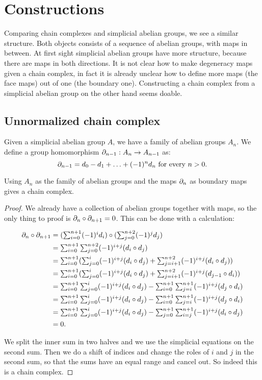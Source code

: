 \section{Constructions}
\label{sec:Constructions}

Comparing chain complexes and simplicial abelian groups, we see a similar structure. Both objects consists of a sequence of abelian groups, with maps in between. At first sight simplicial abelian groups have more structure, because there are maps in both directions. It is not clear how to make degeneracy maps given a chain complex, in fact it is already unclear how to define more maps (the face maps) out of one (the boundary one). Constructing a chain complex from a simplicial abelian group on the other hand seems doable.

\subsection{Unnormalized chain complex}
Given a simplicial abelian group $A$, we have a family of abelian groups $A_n$. We define a group homomorphism $\partial_{n-1} : A_n \to A_{n-1}$ as:
$$\partial_{n-1} = d_0 - d_1 + \ldots + (-1)^n d_n \text{ for every } n > 0.$$
\begin{lemma}
	Using $A_n$ as the family of abelian groups and the maps $\partial_n$ as boundary maps gives a chain complex.
\end{lemma}
\begin{proof}
	We already have a collection of abelian groups together with maps, so the only thing to proof is $\partial_n \circ \partial_{n+1} = 0$. This can be done with a calculation:

	\begin{align*}
		\partial_n \circ \partial_{n+1} &= \textstyle (\sum_{i=0}^{n+1} (-1)^i d_i) \circ (\sum_{j=0}^{n+2} (-1)^j d_j) \\
			&= \textstyle \sum_{i=0}^{n+1}  \sum_{j=0}^{n+2} (-1)^{i+j} (d_i \circ d_j) \\
			&= \textstyle \sum_{i=0}^{n+1} (\sum_{j=0}^{i} (-1)^{i+j} (d_i \circ d_j) + \sum_{j=i+1}^{n+2} (-1)^{i+j} (d_i \circ d_j)) \\
			&= \textstyle \sum_{i=0}^{n+1} (\sum_{j=0}^{i} (-1)^{i+j} (d_i \circ d_j) + \sum_{j=i+1}^{n+2} (-1)^{i+j} (d_{j-1} \circ d_i)) \\
			&= \textstyle \sum_{i=0}^{n+1}  \sum_{j=0}^{i} (-1)^{i+j} (d_i \circ d_j) - \sum_{i=0}^{n+1} \sum_{j=i}^{n+1} (-1)^{i+j} (d_j \circ d_i) \\
			&= \textstyle \sum_{i=0}^{n+1}  \sum_{j=0}^{i} (-1)^{i+j} (d_i \circ d_j) - \sum_{i=0}^{n+1} \sum_{j=i}^{n+1} (-1)^{i+j} (d_j \circ d_i) \\
			&= \textstyle \sum_{i=0}^{n+1}  \sum_{j=0}^{i} (-1)^{i+j} (d_i \circ d_j) - \sum_{j=0}^{n+1} \sum_{i=j}^{n+1} (-1)^{i+j} (d_i \circ d_j) \\
			&= 0.
	\end{align*}

	We split the inner sum in two halves and we use the simplicial equations on the second sum. Then we do a shift of indices and change the roles of $i$ and $j$ in the second sum, so that the sums have an equal range and cancel out. So indeed this is a chain complex.
\end{proof}

